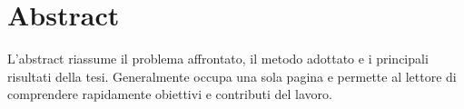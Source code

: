 \chapter*{Abstract}

L'abstract riassume il problema affrontato, il metodo adottato e i principali
risultati della tesi. Generalmente occupa una sola pagina e permette al lettore
di comprendere rapidamente obiettivi e contributi del lavoro.
